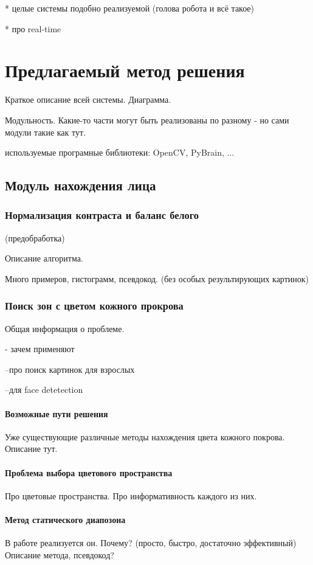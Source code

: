 \documentclass[12pt]{report}
\begin{document}
* целые системы подобно реализуемой (голова робота и всё такое)

* про real-time

\chapter{Предлагаемый метод решения}
\thispagestyle{fancy}

Краткое описание всей системы. Диаграмма.

Модульность. Какие-то части могут быть реализованы по разному - но сами модули такие как тут.

используемые програмные библиотеки: OpenCV, PyBrain, ...

\section{Модуль нахождения лица}

\subsection{Нормализация контраста и баланс белого}
(предобработка)

Описание алгоритма.

Много примеров, гистограмм, псевдокод. (без особых результирующих картинок)

\subsection{Поиск зон с цветом кожного прокрова}
Общая информация о проблеме.

- зачем применяют 

	--про поиск картинок для взрослых
	
	--для face detetection
\subsubsection{Возможные пути решения}
Уже существующие различные методы нахождения цвета кожного покрова. Описание тут.
\subsubsection{Проблема выбора цветового пространства}
Про цветовые пространства. Про информативность каждого из них.
\subsubsection{Метод статического диапозона}
В работе реализуется он. Почему? (просто, быстро, достаточно эффективный)
Описание метода, псевдокод?
\end{document}
